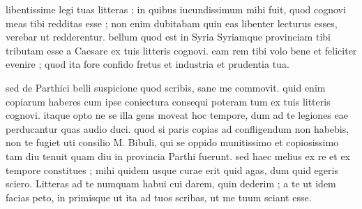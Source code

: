 


 libentissime legi tuas litteras ; in quibus iucundissimum mihi fuit, quod cognovi meas tibi redditas esse ; non enim dubitabam quin eas libenter lecturus esses, verebar ut redderentur. bellum quod est in Syria Syriamque provinciam tibi tributam esse a Caesare ex tuis litteris cognovi. eam rem tibi volo bene et feliciter evenire ; quod ita fore confido fretus et industria et prudentia tua.

 sed de Parthici belli suspicione quod scribis, sane me commovit. quid enim copiarum haberes cum ipse coniectura consequi poteram tum ex tuis litteris cognovi. itaque opto ne se illa gens moveat hoc tempore, dum ad te legiones eae perducantur quas audio duci. quod si paris copias ad confligendum non habebis, non te fugiet uti consilio M. Bibuli, qui se oppido munitissimo et copiosissimo tam diu tenuit quam diu in provincia Parthi fuerunt. sed haec melius ex re et ex tempore constitues ; mihi quidem usque curae erit quid agas, dum quid egeris sciero. Litteras ad te numquam habui cui darem, quin dederim ; a te ut idem facias peto, in primisque ut ita ad tuos scribas, ut me tuum sciant esse.
